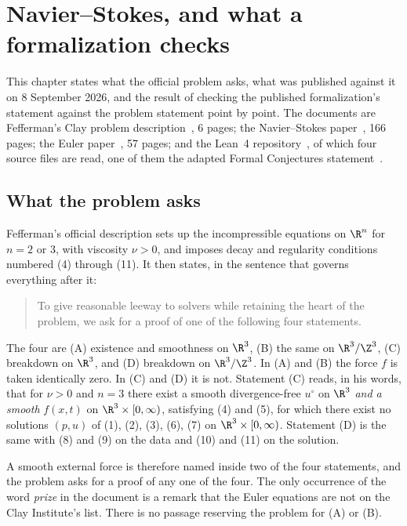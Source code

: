 \chapter{Navier--Stokes, and what a formalization checks}

This chapter states what the official problem asks, what was published against it on 8 September
2026, and the result of checking the published formalization's statement against the problem
statement point by point. The documents are Fefferman's Clay problem
description~\cite{src:Fefferman}, 6 pages; the Navier--Stokes paper~\cite{src:OpenAI-2026-Navier-Stokes},
166 pages; the Euler paper~\cite{src:OpenAI-2026-Euler}, 57 pages; and the Lean~4
repository~\cite{src:OpenAI-2026-Lean}, of which four source files are read, one of them the adapted
Formal Conjectures statement~\cite{src:Formal-Conjectures}.

\section{What the problem asks}

Fefferman's official description sets up the incompressible equations on $\R^n$ for $n=2$ or $3$,
with viscosity $\nu > 0$, and imposes decay and regularity conditions numbered (4) through (11). It
then states, in the sentence that governs everything after it:

\begin{quote}
To give reasonable leeway to solvers while retaining the heart of the problem, we ask for a proof
of one of the following four statements.
\end{quote}

The four are (A) existence and smoothness on $\R^3$, (B) the same on $\R^3/\Z^3$, (C) breakdown on
$\R^3$, and (D) breakdown on $\R^3/\Z^3$. In (A) and (B) the force $f$ is taken identically zero. In
(C) and (D) it is not. Statement (C) reads, in his words, that for $\nu>0$ and $n=3$ there exist a
smooth divergence-free $u^\circ$ on $\R^3$ \emph{and a smooth} $f(x,t)$ on
$\R^3\times[0,\infty)$, satisfying (4) and (5), for which there exist no solutions $(p,u)$ of (1),
(2), (3), (6), (7) on $\R^3\times[0,\infty)$. Statement (D) is the same with (8) and (9) on the data
and (10) and (11) on the solution.

A smooth external force is therefore named inside two of the four statements, and the problem asks
for a proof of any one of the four. The only occurrence of the word \emph{prize} in the document
is a remark that the Euler equations are not on the Clay Institute's list. There is no passage
reserving the problem for (A) or (B).

